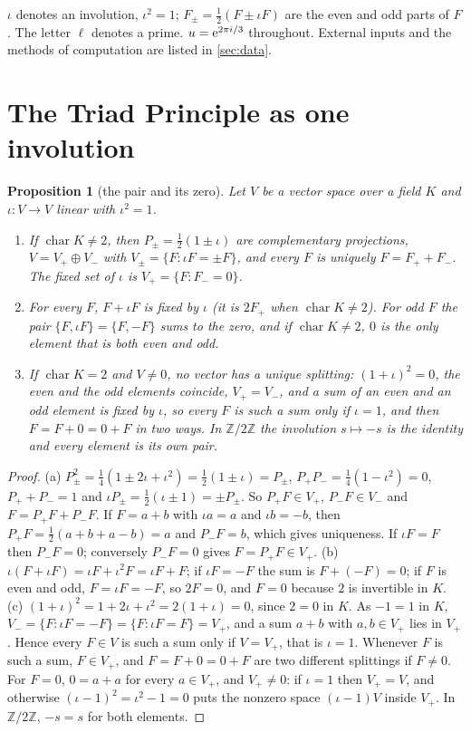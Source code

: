 \documentclass[11pt]{article}
\newtheorem{proposition}[theorem]{Proposition}
\theoremstyle{definition}\newtheorem{definition}[theorem]{Definition}
\theoremstyle{remark}\newtheorem{remark}[theorem]{Remark}
\begin{document}
$\iota$ denotes an involution, $\iota^2=1$; $F_\pm=\frac12(F\pm\iota F)$ are the even and odd parts of $F$. The letter $\ell$ denotes a prime. $u=\mathrm e^{2\pi i/3}$ throughout. External inputs and the methods of computation are listed in \cref{sec:data}.

\section{The Triad Principle as one involution}\label{sec:principle}

\begin{proposition}[the pair and its zero]\label{prop:parts}
Let $V$ be a vector space over a field $K$ and $\iota\colon V\to V$ linear with $\iota^2=1$.
\begin{enumerate}[label=(\alph*)]
\item If $\operatorname{char}K\neq2$, then $P_\pm=\frac12(1\pm\iota)$ are complementary projections, $V=V_+\oplus V_-$ with $V_\pm=\{F:\iota F=\pm F\}$, and every $F$ is uniquely $F=F_++F_-$. The fixed set of $\iota$ is $V_+=\{F:F_-=0\}$.
\item For every $F$, $F+\iota F$ is fixed by $\iota$ (it is $2F_+$ when $\operatorname{char}K\ne2$). For odd $F$ the pair $\{F,\iota F\}=\{F,-F\}$ sums to the zero, and if $\operatorname{char}K\neq2$, $0$ is the only element that is both even and odd.
\item If $\operatorname{char}K=2$ and $V\ne0$, no vector has a unique splitting: $(1+\iota)^2=0$, the even and the odd elements coincide, $V_+=V_-$, and a sum of an even and an odd element is fixed by $\iota$, so every $F$ is such a sum only if $\iota=1$, and then $F=F+0=0+F$ in two ways. In $\mathbb Z/2\mathbb Z$ the involution $s\mapsto-s$ is the identity and every element is its own pair.
\end{enumerate}
\end{proposition}
\begin{proof}
(a) $P_\pm^2=\frac14(1\pm2\iota+\iota^2)=\frac12(1\pm\iota)=P_\pm$, $P_+P_-=\frac14(1-\iota^2)=0$, $P_++P_-=1$ and $\iota P_\pm=\frac12(\iota\pm1)=\pm P_\pm$. So $P_+F\in V_+$, $P_-F\in V_-$ and $F=P_+F+P_-F$. If $F=a+b$ with $\iota a=a$ and $\iota b=-b$, then $P_+F=\frac12(a+b+a-b)=a$ and $P_-F=b$, which gives uniqueness. If $\iota F=F$ then $P_-F=0$; conversely $P_-F=0$ gives $F=P_+F\in V_+$. (b) $\iota(F+\iota F)=\iota F+\iota^2F=\iota F+F$; if $\iota F=-F$ the sum is $F+(-F)=0$; if $F$ is even and odd, $F=\iota F=-F$, so $2F=0$, and $F=0$ because $2$ is invertible in $K$. (c) $(1+\iota)^2=1+2\iota+\iota^2=2(1+\iota)=0$, since $2=0$ in $K$. As $-1=1$ in $K$, $V_-=\{F:\iota F=-F\}=\{F:\iota F=F\}=V_+$, and a sum $a+b$ with $a,b\in V_+$ lies in $V_+$. Hence every $F\in V$ is such a sum only if $V=V_+$, that is $\iota=1$. Whenever $F$ is such a sum, $F\in V_+$, and $F=F+0=0+F$ are two different splittings if $F\ne0$. For $F=0$, $0=a+a$ for every $a\in V_+$, and $V_+\ne0$: if $\iota=1$ then $V_+=V$, and otherwise $(\iota-1)^2=\iota^2-1=0$ puts the nonzero space $(\iota-1)V$ inside $V_+$. In $\mathbb Z/2\mathbb Z$, $-s=s$ for both elements.
\end{proof}
\end{document}
